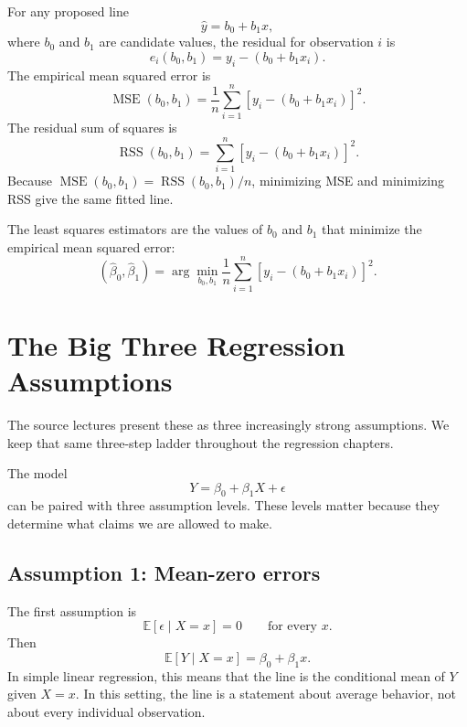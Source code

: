 For any proposed line
\begin{equation}
  \widehat{y}=b_0+b_1x,
\end{equation}
where $b_0$ and $b_1$ are candidate values, the residual for observation $i$ is
\begin{equation}
  e_i(b_0,b_1)=y_i-(b_0+b_1x_i).
\end{equation}
The empirical mean squared error is
\begin{equation}
  \operatorname{MSE}(b_0,b_1)=\frac{1}{n}\sum_{i=1}^n\left[y_i-(b_0+b_1x_i)\right]^2.
  \label{eq:ch5-empirical-mse}
\end{equation}
The residual sum of squares is
\begin{equation}
  \operatorname{RSS}(b_0,b_1)=\sum_{i=1}^n\left[y_i-(b_0+b_1x_i)\right]^2.
  \label{eq:ch5-rss}
\end{equation}
Because $\operatorname{MSE}(b_0,b_1)=\operatorname{RSS}(b_0,b_1)/n$, minimizing MSE and minimizing RSS give the same fitted line.

The least squares estimators are the values of $b_0$ and $b_1$ that minimize the empirical mean squared error:
\begin{equation}
  (\widehat{\beta}_0,\widehat{\beta}_1)
  =\arg\min_{b_0,b_1}\frac{1}{n}\sum_{i=1}^n\left[y_i-(b_0+b_1x_i)\right]^2.
  \label{eq:ch5-lse-objective}
\end{equation}

\section{The Big Three Regression Assumptions}

The source lectures present these as three increasingly strong assumptions.  We keep that same three-step ladder throughout the regression chapters.

The model
\begin{equation}
  Y=\beta_0+\beta_1X+\epsilon
\end{equation}
can be paired with three assumption levels.  These levels matter because they determine what claims we are allowed to make.

\subsection{Assumption 1: Mean-zero errors}

The first assumption is
\begin{equation}
  \mathbb{E}[\epsilon\mid X=x]=0 \qquad \text{for every }x.
  \label{eq:ch5-mean-zero-error}
\end{equation}
Then
\begin{equation}
  \mathbb{E}[Y\mid X=x]=\beta_0+\beta_1x.
\end{equation}
In simple linear regression, this means that the line is the conditional mean of $Y$ given $X=x$.  In this setting, the line is a statement about average behavior, not about every individual observation.


